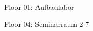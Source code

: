 \documentclass[a4paper]{article}
\begin{document}
\printHeaderLC
\begin{center}
\begin{vsltext}{2cm}{2.4cm}

   \vspace{2.5cm}

    Floor 01: Aufbaulabor\\
    
    \vspace{1cm}

    Floor 04: Seminarraum 2-7\\
\end{vsltext}

\end{center}
\end{document}
